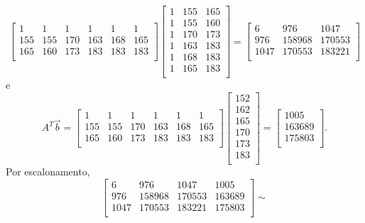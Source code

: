 \documentclass[../livro.tex]{subfiles}  %
\begin{document}
\begin{example}
\[  \begin{bmatrix}
    1 & 1 & 1 & 1 & 1 & 1 \\
    155 & 155 & 170 & 163 & 168 & 165 \\
    165 & 160 & 173 & 183 & 183 & 183 \\
  \end{bmatrix}
  \begin{bmatrix}
    1 & 155 & 165 \\
    1 & 155 & 160 \\
    1 & 170 & 173 \\
    1 & 163 & 183 \\
    1 & 168 & 183 \\
    1 & 165 & 183 \\
  \end{bmatrix} =
  \begin{bmatrix}
    6 & 976 & 1047 \\
    976 & 158968 & 170553 \\
    1047 & 170553 & 183221 \\
  \end{bmatrix}
  \] e
  \[
  A^T \vec{b} =
  \begin{bmatrix}
    1 & 1 & 1 & 1 & 1 & 1 \\
    155 & 155 & 170 & 163 & 168 & 165 \\
    165 & 160 & 173 & 183 & 183 & 183 \\
  \end{bmatrix}
  \begin{bmatrix}
    152  \\
    162  \\
    165  \\
    170  \\
    173  \\
    183  \\
  \end{bmatrix} =
  \begin{bmatrix}
    1005  \\
    163689  \\
    175803 \\
  \end{bmatrix}.
  \] Por escalonamento,
  \[
  \begin{bmatrix}
    6    & 976    & 1047   & 1005     \\
    976  & 158968 & 170553 & 163689   \\
    1047 & 170553 & 183221 & 175803   \\
  \end{bmatrix} \sim
\]
\end{example}
\end{document}
